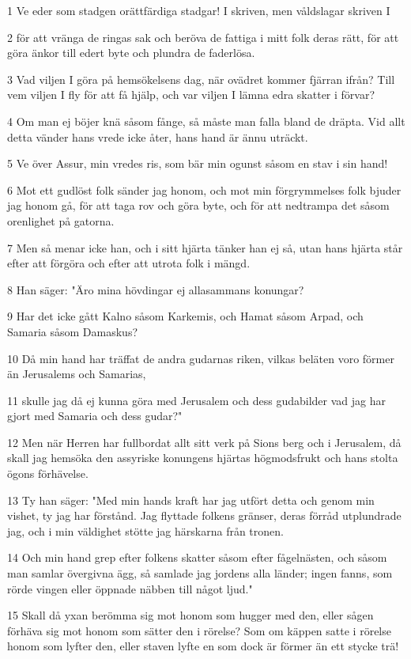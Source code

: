 \par 1 Ve eder som stadgen orättfärdiga stadgar! I skriven, men våldslagar skriven I
\par 2 för att vränga de ringas sak och beröva de fattiga i mitt folk deras rätt, för att göra änkor till edert byte och plundra de faderlösa.
\par 3 Vad viljen I göra på hemsökelsens dag, när ovädret kommer fjärran ifrån? Till vem viljen I fly för att få hjälp, och var viljen I lämna edra skatter i förvar?
\par 4 Om man ej böjer knä såsom fånge, så måste man falla bland de dräpta. Vid allt detta vänder hans vrede icke åter, hans hand är ännu uträckt.
\par 5 Ve över Assur, min vredes ris, som bär min ogunst såsom en stav i sin hand!
\par 6 Mot ett gudlöst folk sänder jag honom, och mot min förgrymmelses folk bjuder jag honom gå, för att taga rov och göra byte, och för att nedtrampa det såsom orenlighet på gatorna.
\par 7 Men så menar icke han, och i sitt hjärta tänker han ej så, utan hans hjärta står efter att förgöra och efter att utrota folk i mängd.
\par 8 Han säger: "Äro mina hövdingar ej allasammans konungar?
\par 9 Har det icke gått Kalno såsom Karkemis, och Hamat såsom Arpad, och Samaria såsom Damaskus?
\par 10 Då min hand har träffat de andra gudarnas riken, vilkas beläten voro förmer än Jerusalems och Samarias,
\par 11 skulle jag då ej kunna göra med Jerusalem och dess gudabilder vad jag har gjort med Samaria och dess gudar?"
\par 12 Men när Herren har fullbordat allt sitt verk på Sions berg och i Jerusalem, då skall jag hemsöka den assyriske konungens hjärtas högmodsfrukt och hans stolta ögons förhävelse.
\par 13 Ty han säger: "Med min hands kraft har jag utfört detta och genom min vishet, ty jag har förstånd. Jag flyttade folkens gränser, deras förråd utplundrade jag, och i min väldighet stötte jag härskarna från tronen.
\par 14 Och min hand grep efter folkens skatter såsom efter fågelnästen, och såsom man samlar övergivna ägg, så samlade jag jordens alla länder; ingen fanns, som rörde vingen eller öppnade näbben till något ljud."
\par 15 Skall då yxan berömma sig mot honom som hugger med den, eller sågen förhäva sig mot honom som sätter den i rörelse? Som om käppen satte i rörelse honom som lyfter den, eller staven lyfte en som dock är förmer än ett stycke trä!
